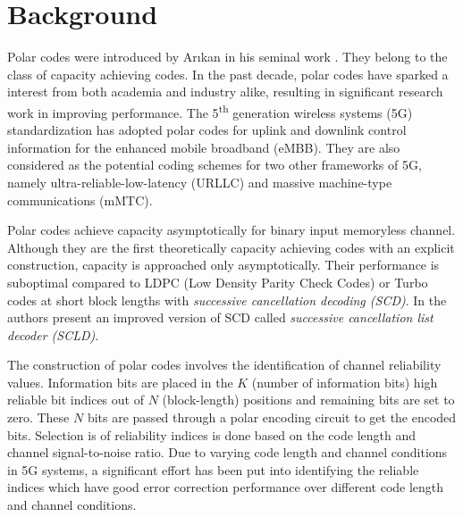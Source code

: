 \chapter{Background} \label{chap:Background}

\setcounter{secnumdepth}{3}
\renewcommand{\thesubsubsection}{\Alph{subsubsection}}



Polar codes were introduced by Ar\i kan in his seminal work \cite{Arikan}. They belong to the class of capacity achieving codes. In the past decade, polar codes have sparked a interest from both academia and industry alike, resulting in significant research work in improving performance. The 5\textsuperscript{th} generation wireless systems (5G) standardization has adopted polar codes for uplink and downlink control information for the enhanced mobile broadband (eMBB). They are also considered as the potential coding schemes for two other frameworks of 5G, namely ultra-reliable-low-latency (URLLC) and massive machine-type communications (mMTC).

Polar codes achieve capacity asymptotically for binary input memoryless channel. Although they are the first theoretically capacity achieving codes with an explicit construction, capacity is approached only asymptotically. Their performance is suboptimal compared to LDPC (Low Density Parity Check Codes) or Turbo codes at short block lengths with \emph{successive cancellation decoding (SCD)}. In \cite{SCL} the authors present an improved version of SCD called \emph{successive cancellation list decoder (SCLD)}.

The construction of polar codes involves the identification of channel reliability values. Information bits are placed in the $ K $ (number of information bits) high reliable bit indices out of $ N $ (block-length) positions and remaining bits are set to zero. These $ N $ bits are passed through a polar encoding circuit to get the encoded bits. Selection is of reliability indices is done based on the code length and channel signal-to-noise ratio. Due to varying code length and channel conditions in 5G systems, a significant effort has been put into identifying the reliable indices which have good error correction performance over different code length and channel conditions.

